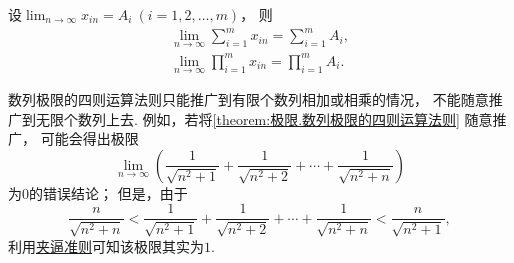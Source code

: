 \begin{corollary}
设\(\lim_{n\to\infty} x_{in} = A_i\ (i=1,2,\dotsc,m)\)，
则\begin{gather*}
	\lim_{n\to\infty} \sum_{i=1}^m x_{in} = \sum_{i=1}^m A_i, \\
	\lim_{n\to\infty} \prod_{i=1}^m x_{in} = \prod_{i=1}^m A_i.
\end{gather*}
\end{corollary}

\begin{remark}
数列极限的四则运算法则只能推广到有限个数列相加或相乘的情况，
不能随意推广到无限个数列上去.
例如，若将\cref{theorem:极限.数列极限的四则运算法则} 随意推广，
可能会得出极限\begin{equation*}
	\lim_{n\to\infty} \left(
		\frac1{\sqrt{n^2+1}}
		+ \frac1{\sqrt{n^2+2}}
		+ \dotsb + \frac1{\sqrt{n^2+n}}
	\right)
\end{equation*}为\(0\)的错误结论；
但是，由于\begin{equation*}
	\frac{n}{\sqrt{n^2+n}}
	< \frac1{\sqrt{n^2+1}}
	+ \frac1{\sqrt{n^2+2}}
	+ \dotsb + \frac1{\sqrt{n^2+n}}
	< \frac{n}{\sqrt{n^2+1}},
\end{equation*}
利用\hyperref[theorem:数列极限.夹逼准则]{夹逼准则}可知该极限其实为\(1\).
\end{remark}


